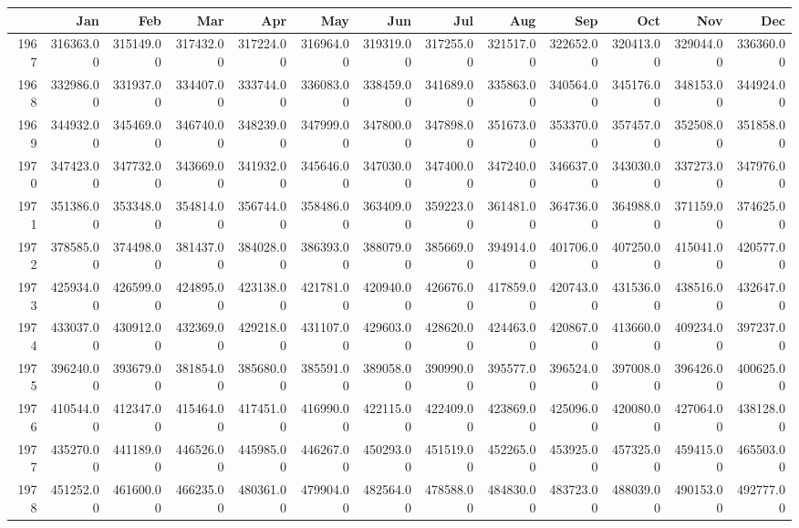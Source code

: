 \begin{longtable}{rrrrrrrrrrrrr}
  \hline
 & Jan & Feb & Mar & Apr & May & Jun & Jul & Aug & Sep & Oct & Nov & Dec \\ 
  \hline
1967 & 316363.00 & 315149.00 & 317432.00 & 317224.00 & 316964.00 & 319319.00 & 317255.00 & 321517.00 & 322652.00 & 320413.00 & 329044.00 & 336360.00 \\ 
  1968 & 332986.00 & 331937.00 & 334407.00 & 333744.00 & 336083.00 & 338459.00 & 341689.00 & 335863.00 & 340564.00 & 345176.00 & 348153.00 & 344924.00 \\ 
  1969 & 344932.00 & 345469.00 & 346740.00 & 348239.00 & 347999.00 & 347800.00 & 347898.00 & 351673.00 & 353370.00 & 357457.00 & 352508.00 & 351858.00 \\ 
  1970 & 347423.00 & 347732.00 & 343669.00 & 341932.00 & 345646.00 & 347030.00 & 347400.00 & 347240.00 & 346637.00 & 343030.00 & 337273.00 & 347976.00 \\ 
  1971 & 351386.00 & 353348.00 & 354814.00 & 356744.00 & 358486.00 & 363409.00 & 359223.00 & 361481.00 & 364736.00 & 364988.00 & 371159.00 & 374625.00 \\ 
  1972 & 378585.00 & 374498.00 & 381437.00 & 384028.00 & 386393.00 & 388079.00 & 385669.00 & 394914.00 & 401706.00 & 407250.00 & 415041.00 & 420577.00 \\ 
  1973 & 425934.00 & 426599.00 & 424895.00 & 423138.00 & 421781.00 & 420940.00 & 426676.00 & 417859.00 & 420743.00 & 431536.00 & 438516.00 & 432647.00 \\ 
  1974 & 433037.00 & 430912.00 & 432369.00 & 429218.00 & 431107.00 & 429603.00 & 428620.00 & 424463.00 & 420867.00 & 413660.00 & 409234.00 & 397237.00 \\ 
  1975 & 396240.00 & 393679.00 & 381854.00 & 385680.00 & 385591.00 & 389058.00 & 390990.00 & 395577.00 & 396524.00 & 397008.00 & 396426.00 & 400625.00 \\ 
  1976 & 410544.00 & 412347.00 & 415464.00 & 417451.00 & 416990.00 & 422115.00 & 422409.00 & 423869.00 & 425096.00 & 420080.00 & 427064.00 & 438128.00 \\ 
  1977 & 435270.00 & 441189.00 & 446526.00 & 445985.00 & 446267.00 & 450293.00 & 451519.00 & 452265.00 & 453925.00 & 457325.00 & 459415.00 & 465503.00 \\ 
  1978 & 451252.00 & 461600.00 & 466235.00 & 480361.00 & 479904.00 & 482564.00 & 478588.00 & 484830.00 & 483723.00 & 488039.00 & 490153.00 & 492777.00 \\ 

\end{longtable}
